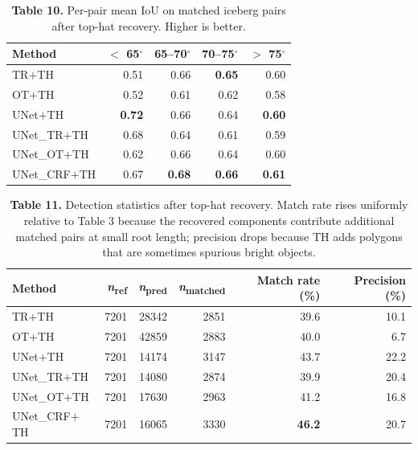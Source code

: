 \documentclass[review,jog]{igs}
\begin{document}
\begin{table}[h]
\caption{\textbf{Table 10.} Per-pair mean IoU on matched iceberg pairs after top-hat recovery. Higher is better.}
\centering
\begin{tabular}{lrrrr}
\toprule
Method & $<$ 65$^\circ$ & 65--70$^\circ$ & 70--75$^\circ$ & $>$ 75$^\circ$ \\
\midrule
TR$+$TH        & 0.51           & 0.66           & \textbf{0.65}  & 0.60 \\
OT$+$TH        & 0.52           & 0.61           & 0.62           & 0.58 \\
UNet$+$TH      & \textbf{0.72}  & 0.66           & 0.64           & \textbf{0.60} \\
UNet\_TR$+$TH  & 0.68           & 0.64           & 0.61           & 0.59 \\
UNet\_OT$+$TH  & 0.62           & 0.66           & 0.64           & 0.60 \\
UNet\_CRF$+$TH & 0.67           & \textbf{0.68}  & \textbf{0.66}  & \textbf{0.61} \\
\bottomrule
\end{tabular}
\end{table}

\begin{table}[h]
\caption{\textbf{Table 11.} Detection statistics after top-hat recovery. Match rate rises uniformly relative to Table 3 because the recovered components contribute additional matched pairs at small root length; precision drops because TH adds polygons that are sometimes spurious bright objects.}
\centering
\begin{tabular}{lrrrrr}
\toprule
Method & \textit{n}\textsubscript{ref} & \textit{n}\textsubscript{pred} & \textit{n}\textsubscript{matched} & Match rate (\%) & Precision (\%) \\
\midrule
TR$+$TH        & 7201 & 28342 & 2851 & 39.6 & 10.1 \\
OT$+$TH        & 7201 & 42859 & 2883 & 40.0 &  6.7 \\
UNet$+$TH      & 7201 & 14174 & 3147 & 43.7 & 22.2 \\
UNet\_TR$+$TH  & 7201 & 14080 & 2874 & 39.9 & 20.4 \\
UNet\_OT$+$TH  & 7201 & 17630 & 2963 & 41.2 & 16.8 \\
UNet\_CRF$+$TH & 7201 & 16065 & 3330 & \textbf{46.2} & 20.7 \\
\bottomrule
\end{tabular}
\end{table}
\end{document}
